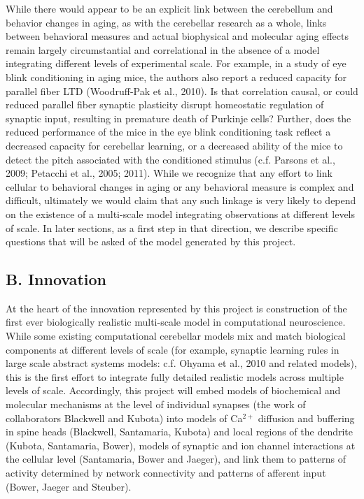 \documentclass[12pt]{article}
\begin{document}
While there would appear to be an explicit link between the cerebellum and behavior changes in aging, as with the cerebellar research as a whole, links between behavioral measures and actual biophysical and molecular aging effects remain largely circumstantial and correlational in the absence of a model integrating different levels of experimental scale. For example, in a study of eye blink conditioning in aging mice, the authors also report a reduced capacity for parallel fiber LTD (Woodruff-Pak et al., 2010). Is that correlation causal, or could reduced parallel fiber synaptic plasticity disrupt homeostatic regulation of synaptic input, resulting in premature death of Purkinje cells? Further, does the reduced performance of the mice in the eye blink conditioning task reflect a decreased capacity for cerebellar learning, or a decreased ability of the mice to detect the pitch associated with the conditioned stimulus (c.f. Parsons et al., 2009; Petacchi et al., 2005; 2011). While we recognize that any effort to link cellular to behavioral changes in aging or any behavioral measure is complex and difficult, ultimately we would claim that any such linkage is very likely to depend on the existence of a multi-scale model integrating observations at different levels of scale. In later sections, as a first step in that direction, we describe specific questions that will be asked of the model generated by this project.\\

\subsection*{B. Innovation}

\noindent At the heart of the innovation represented by this project is construction of the first ever biologically realistic multi-scale model in computational neuroscience. While some existing computational cerebellar models mix and match biological components at different levels of scale (for example, synaptic learning rules in large scale abstract systems models: c.f. Ohyama et al., 2010 and related models), this is the first effort to integrate fully detailed realistic models across multiple levels of scale. Accordingly, this project will embed models of biochemical and molecular mechanisms at the level of individual synapses (the work of collaborators Blackwell and Kubota) into models of Ca$^{2+}$ diffusion and buffering in spine heads (Blackwell, Santamaria, Kubota) and local regions of the dendrite (Kubota, Santamaria, Bower), models of synaptic and ion channel interactions at the cellular level (Santamaria, Bower and Jaeger), and link them to patterns of activity determined by network connectivity and patterns of afferent input (Bower, Jaeger and Steuber).\\
\end{document}
